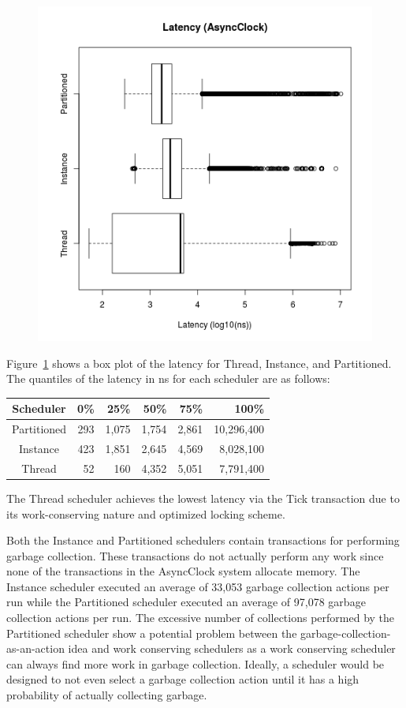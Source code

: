 \begin{figure}
\center
\includegraphics[height=.4\textheight]{async_latency_box.png}
\caption{\label{async_latency_box}}
\end{figure}

Figure~\ref{async_latency_box} shows a box plot of the latency for Thread, Instance, and Partitioned.
The quantiles of the latency in ns for each scheduler are as follows:
\begin{center}
\begin{tabular}{crrrrr}
Scheduler &       0\%  &    25\%  &    50\%  &    75\%  &   100\% \\
\hline
Partitioned & 293 & 1,075 & 1,754 & 2,861 & 10,296,400 \\
Instance    & 423 & 1,851 & 2,645 & 4,569 &  8,028,100 \\
Thread      &  52 &   160 & 4,352 & 5,051 &  7,791,400 \\
\end{tabular}
\end{center}
The Thread scheduler achieves the lowest latency via the Tick transaction due to its work-conserving nature and optimized locking scheme.

Both the Instance and Partitioned schedulers contain transactions for performing garbage collection.
These transactions do not actually perform any work since none of the transactions in the AsyncClock system allocate memory.
The Instance scheduler executed an average of 33,053 garbage collection actions per run while the Partitioned scheduler executed an average of 97,078 garbage collection actions per run.
The excessive number of collections performed by the Partitioned scheduler show a potential problem between the garbage-collection-as-an-action idea and work conserving schedulers as a work conserving scheduler can always find more work in garbage collection.
Ideally, a scheduler would be designed to not even select a garbage collection action until it has a high probability of actually collecting garbage.

